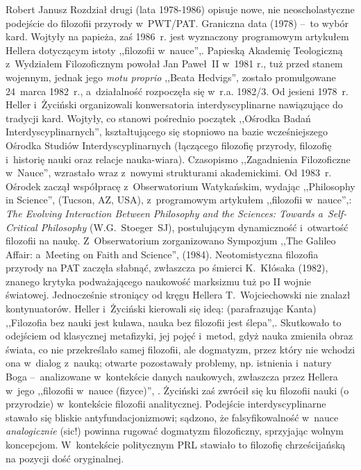 \begin{newrevplenv}{Robert Janusz}
Rozdział drugi (lata 1978-1986) opisuje nowe, nie neoscholastyczne podejście do filozofii przyrody w~PWT/PAT. Graniczna data (1978) --~to wybór kard. Wojtyły na papieża, zaś 1986~r. jest wyznaczony programowym artykułem Hellera dotyczącym istoty ,,filozofii w~nauce'',. Papieską Akademię Teologiczną z~Wydziałem Filozoficznym powołał Jan Paweł~II w~1981 r., tuż przed stanem wojennym, jednak jego \textit{motu proprio} ,,Beata Hedvigs'', zostało promulgowane 24~marca 1982~r., a~działalność rozpoczęła się w~r.a. 1982/3. Od jesieni 1978~r. Heller i~Życiński organizowali konwersatoria interdyscyplinarne nawiązujące do tradycji kard. Wojtyły, co stanowi pośrednio początek ,,Ośrodka Badań Interdyscyplinarnych'', kształtującego się stopniowo na bazie wcześniejszego Ośrodka Studiów Interdyscyplinarnych (łączącego filozofię przyrody, filozofię i~historię nauki oraz relacje nauka-wiara). Czasopismo ,,Zagadnienia Filozoficzne w~Nauce'', wzrastało wraz z~nowymi strukturami akademickimi. Od 1983~r. Ośrodek zaczął współpracę z~Obserwatorium Watykańskim, wydając ,,Philosophy in Science'', (Tucson, AZ, USA), z~programowym artykułem ,,filozofii w~nauce'',: \textit{The Evolving Interaction Between Philosophy and the Sciences: Towards a~Self-Critical Philosophy} (W.G.~Stoeger~SJ), postulującym dynamiczność i~otwartość filozofii na naukę. Z~Obserwatorium zorganizowano Sympozjum ,,The Galileo Affair: a~Meeting on Faith and Science'', (1984). Neotomistyczna filozofia przyrody na PAT zaczęła słabnąć, zwłaszcza po śmierci K.~Kłósaka (1982), znanego krytyka podważającego naukowość marksizmu tuż po II wojnie światowej. Jednocześnie stroniący od kręgu Hellera T.~Wojciechowski nie znalazł kontynuatorów. Heller i~Życiński kierowali się ideą: (parafrazując Kanta) ,,Filozofia bez nauki jest kulawa, nauka bez filozofii jest ślepa'',. Skutkowało to odejściem od klasycznej metafizyki, jej pojęć i~metod, gdyż nauka zmieniła obraz świata, co nie przekreślało samej filozofii, ale dogmatyzm, przez który nie wchodzi ona w~dialog z~nauką; otwarte pozostawały problemy, np. istnienia i~natury Boga --~analizowane w~kontekście danych naukowych, zwłaszcza przez Hellera w~jego ,,filozofii w~nauce (fizyce)'',
\parencites[zob.][]{heller_how_2019}[zob. także][]{polak_philosophy_2019}. %
 Życiński zaś zwrócił się ku filozofii nauki (o przyrodzie) w~kontekście filozofii analitycznej. Podejście interdyscyplinarne stawało się bliskie antyfundacjonizmowi; sądzono, że falsyfikowalność w~nauce \textit{analogicznie} (sic!) powinna rugować dogmatyzm filozoficzny, sprzyjając wolnym koncepcjom. W~kontekście politycznym PRL stawiało to filozofię chrześcijańską na pozycji dość oryginalnej.


\end{newrevplenv}
